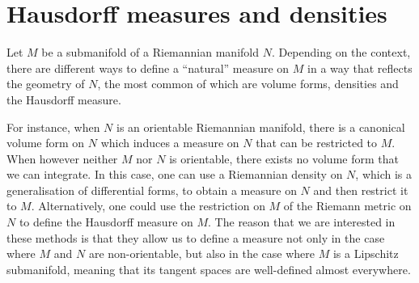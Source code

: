 \documentclass{report}
\begin{document}
\section{Hausdorff measures and densities}\label{sec:measures_and_densities}
Let $M$ be a submanifold of a Riemannian manifold $N$.
Depending on the context, there are different ways to define a ``natural'' measure on $M$ in a way that reflects the geometry of $N$, the most common of which are volume forms, densities and the Hausdorff measure.

For instance, when $N$ is an orientable Riemannian manifold, there is a canonical volume form on $N$ which induces a measure on $N$ that can be restricted to $M$.
When however neither $M$ nor $N$ is orientable, there exists no volume form that we can integrate.
In this case, one can use a Riemannian density on $N$, which is a generalisation of differential forms, to obtain a measure on $N$ and then restrict it to $M$.
Alternatively, one could use the restriction on $M$ of the Riemann metric on $N$ to define the Hausdorff measure on $M$.
The reason that we are interested in these methods is that they allow us to define a measure not only in the case where $M$ and $N$ are non-orientable, but also in the case where $M$ is a Lipschitz submanifold, meaning that its tangent spaces are well-defined almost everywhere.
\end{document}
